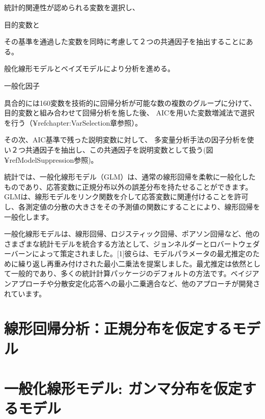 \documentclass[a4j,11pt,mc]{jreport}
\begin{document}
統計的関連性が認められる変数を選択し、


目的変数と





その基準を通過した変数を同時に考慮して２つの共通因子を抽出することにある。


般化線形モデルとベイズモデルにより分析を進める。

一般化因子


具合的には160変数を技術的に回帰分析が可能な数の複数のグループに分けて、
目的変数と組み合わせて回帰分析を施した後、
AICを用いた変数増減法で選択を行う（¥ref{chapter:VarSelection}章参照）。


その次、AIC基準で残った説明変数に対して、
多変量分析手法の因子分析を使い２つ共通因子を抽出し、この共通因子を説明変数として扱う(図¥ref{ModelSuppression}参照)。







統計では、一般化線形モデル（GLM）は、通常の線形回帰を柔軟に一般化したものであり、応答変数に正規分布以外の誤差分布を持たせることができます。 GLMは、線形モデルをリンク関数を介して応答変数に関連付けることを許可し、各測定値の分散の大きさをその予測値の関数にすることにより、線形回帰を一般化します。

一般化線形モデルは、線形回帰、ロジスティック回帰、ポアソン回帰など、他のさまざまな統計モデルを統合する方法として、ジョンネルダーとロバートウェダーバーンによって策定されました。[1]彼らは、モデルパラメータの最尤推定のために繰り返し再重み付けされた最小二乗法を提案しました。最尤推定は依然として一般的であり、多くの統計計算パッケージのデフォルトの方法です。ベイジアンアプローチや分散安定化応答への最小二乗適合など、他のアプローチが開発されています。







	\section{線形回帰分析：正規分布を仮定するモデル}



	\section{一般化線形モデル: ガンマ分布を仮定するモデル}
\end{document}
